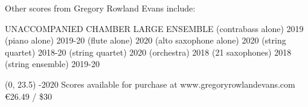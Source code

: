 \documentclass[11pt]{article}
\begin{document}

\begin{center}
\fontsize{.6cm}{1em}\selectfont Other scores from Gregory Rowland Evans include: \hfill
\end{center}
\vspace*{4\baselineskip}
{
\begin{center}
\setlength{\columnseprule}{1pt}
\setlength{\columnsep}{6em}

\begin{paracol}{3}
\fontsize{.6cm}{1em}\selectfont UNACCOMPANIED
\switchcolumn[1]
\fontsize{.6cm}{1em}\selectfont CHAMBER
\switchcolumn[2]
\fontsize{.6cm}{1em}\selectfont LARGE ENSEMBLE
\switchcolumn[0]
\fontsize{.1cm}{0.5em}  (contrabass alone) 2019
\switchcolumn[0]
\fontsize{.1cm}{0.5em}  (piano alone) 2019-20
\switchcolumn[0]
\fontsize{.1cm}{0.5em}  (flute alone) 2020
\switchcolumn[0]
\fontsize{.1cm}{0.5em}  (alto saxophone alone) 2020
\switchcolumn[1]
\fontsize{.1cm}{0.5em}  (string quartet) 2018-20
\switchcolumn[1]
\fontsize{.1cm}{0.5em}  (string quartet) 2020
\switchcolumn[2]
\fontsize{.1cm}{0.5em}  (orchestra) 2018
\switchcolumn[2]
\fontsize{.1cm}{0.5em}  (21 saxophones) 2018
\switchcolumn[2]
\fontsize{.1cm}{0.5em}  (string ensemble) 2019-20


\end{paracol}
\end{center}
}

\begin{textblock}{23}(0, 23.5)
-2020 \hfill
Scores available for purchase at www.gregoryrowlandevans.com \hfill
\euro 26.49 / \$30
\end{textblock}
\end{document}
